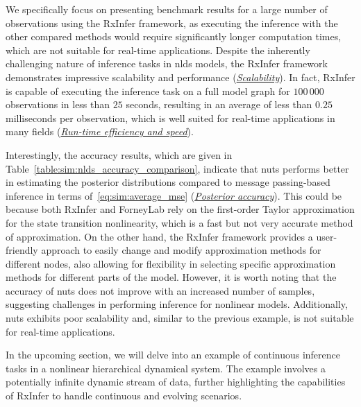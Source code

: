 We specifically focus on presenting benchmark results for a large number of observations using
the RxInfer framework, as executing the inference with the other compared methods would
require significantly longer computation times, which are not suitable for real-time
applications.
Despite the inherently challenging nature of inference tasks in \ac{nlds} models, the RxInfer
framework demonstrates impressive scalability and performance (\hyperlink{experiments:scalability}{\emph{Scalability}}).
In fact, RxInfer is capable of executing the inference task on a full model graph for
$100\,000$ observations in less than $25$ seconds, resulting in an average of less than $0.25$
milliseconds per observation, which is well suited for real-time applications in many
fields (\hyperlink{experiments:efficiency}{\emph{Run-time efficiency and speed}}).

Interestingly, the accuracy results, which are given in Table~\ref{table:sim:nlds_accuracy_comparison}, indicate
that \ac{nuts} performs better in estimating the posterior distributions compared to message
passing-based inference in terms of~\eqref{eq:sim:average_mse} (\hyperlink{experiments:accuracy}{\emph{Posterior accuracy}}).
This could be because both RxInfer and ForneyLab rely on the first-order Taylor approximation
for the state transition nonlinearity, which is a fast but not very accurate method of approximation.
On the other hand, the RxInfer framework provides a user-friendly approach to easily change
and modify approximation methods for different nodes, also allowing for flexibility in
selecting specific approximation methods for different parts of the model.
However, it is worth noting that the accuracy of \ac{nuts} does not improve with an increased
number of samples, suggesting challenges in performing inference for nonlinear models.
Additionally, \ac{nuts} exhibits poor scalability and, similar to the previous example, is not
suitable for real-time applications.

In the upcoming section, we will delve into an example of continuous inference tasks in a nonlinear hierarchical dynamical system.
The example involves a potentially infinite dynamic stream of data, further highlighting the
capabilities of RxInfer to handle continuous and evolving scenarios.
